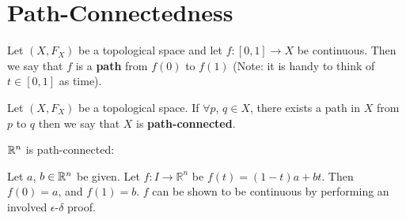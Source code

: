 \section{Path-Connectedness} 
\begin{definition}
Let $(X, F_X)$ be a topological space and let $f:[0,1] \rightarrow X$ be continuous. Then we say that $f$ is a \textbf{path} from $f(0)$ to $f(1)$ (Note: it is handy to think of $t \in [0,1]$ as time). 
\end{definition}
\begin{definition}
Let $(X, F_X)$ be a topological space. If $\forall p$, $q \in X$, there exists a path in $X$ from $p$ to $q$ then we say that $X$ is \textbf{path-connected}. 
\end{definition}
\begin{example}
$\mathbb R^n$ is path-connected:

Let $a$, $b \in \mathbb R^n$ be given. Let $f: I \rightarrow \mathbb{R}^n$ be $f(t) = (1-t)a + bt$. Then $f(0) = a$, and $f(1) = b$. $f$ can be shown to be continuous by performing an involved $\epsilon$-$\delta$ proof. 
\end{example}

